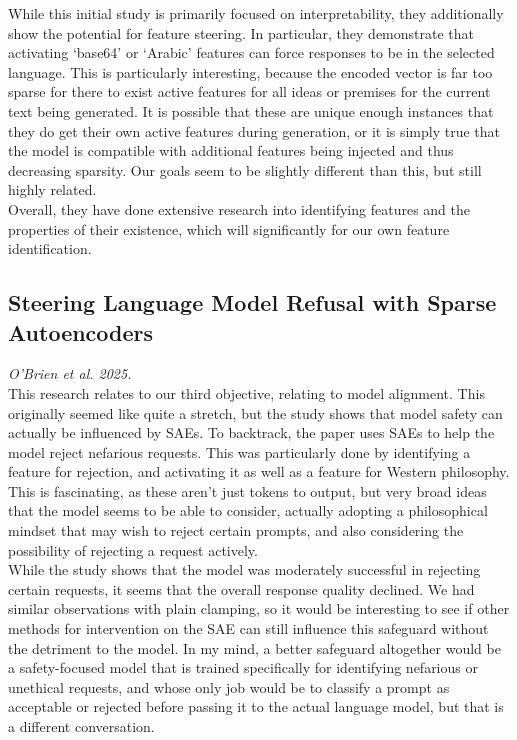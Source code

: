 \documentclass{article}
\begin{document}
While this initial study is primarily focused on interpretability, they additionally show the potential for feature steering. In particular, they demonstrate that activating ‘base64’ or ‘Arabic’ features can force responses to be in the selected language. This is particularly interesting, because the encoded vector is far too sparse for there to exist active features for all ideas or premises for the current text being generated. It is possible that these are unique enough instances that they do get their own active features during generation, or it is simply true that the model is compatible with additional features being injected and thus decreasing sparsity. Our goals seem to be slightly different than this, but still highly related.\\

Overall, they have done extensive research into identifying features and the properties of their existence, which will significantly for our own feature identification.

\subsection{Steering Language Model Refusal with Sparse Autoencoders}
\textit{O’Brien et al. 2025.}
\cite{refusal}\\

This research relates to our third objective, relating to model alignment. This originally seemed like quite a stretch, but the study shows that model safety can actually be influenced by SAEs. To backtrack, the paper uses SAEs to help the model reject nefarious requests. This was particularly done by identifying a feature for rejection, and activating it as well as a feature for Western philosophy. This is fascinating, as these aren’t just tokens to output, but very broad ideas that the model seems to be able to consider, actually adopting a philosophical mindset that may wish to reject certain prompts, and also considering the possibility of rejecting a request actively.\\

While the study shows that the model was moderately successful in rejecting certain requests, it seems that the overall response quality declined. We had similar observations with plain clamping, so it would be interesting to see if other methods for intervention on the SAE can still influence this safeguard without the detriment to the model. In my mind, a better safeguard altogether would be a safety-focused model that is trained specifically for identifying nefarious or unethical requests, and whose only job would be to classify a prompt as acceptable or rejected before passing it to the actual language model, but that is a different conversation. \\
\end{document}
